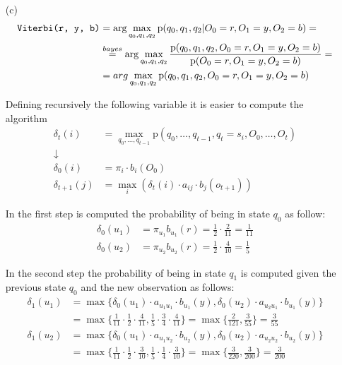 {\begin{itemize}
		\item[(c)]
			\begin{align*}
			\text{\texttt{Viterbi(r, y, b)}} & = \arg \max_{q_0, q_1, q_2} 
			\mathrm{p}(q_0, q_1, q_2 | O_0= r, O_1=y,O_2=b) = \\
			& \overset{bayes}{=} \arg \max_{q_0, q_1, q_2} 
			\frac{\mathrm{p}(q_0, q_1, q_2, O_0= r, O_1=y,O_2=b) 
			}{\mathrm{p}(O_0= r, O_1=y,O_2=b) } = \\
			& = arg \max_{q_0, q_1, q_2} \mathrm{p}(q_0, q_1, q_2, O_0= r, 
			O_1=y,O_2=b)
			\end{align*}
			
			Defining recursively the following variable it is easier to compute 
			the algorithm 
			\begin{align*}
				\delta_{t}(i) & = \max_{q_0, \dots, q_{t-1}} \mathrm{p} (q_0, 
				\dots, q_{t-1}, q_t=s_i, O_0, \dots, O_t)\\
				 \downarrow &\\
				\delta_0(i) & =\pi_i \cdot b_i (O_0) \\ 
				\delta_{t+1}(j) & = \max_i (\delta_t(i)\cdot a_{ij}\cdot 
				b_j(o_{t+1}))
			\end{align*}
			
			In the first step is computed the probability of being in state 
			$q_0$ as follow:
			\begin{align*}
			\delta_0(u_1) & =\pi_{u_1} b_{u_1}(r) = \frac{1}{2} \cdot 
			\frac{2}{11} = \frac{1}{11} \\
			\delta_0(u_2) & = \pi_{u_2} b_{u_2}(r) = \frac{1}{2} \cdot 
			\frac{4}{10} = \frac{1}{5}
			\end{align*}
			
			In the second step the probability of being in state $q_1$ is 
			computed given the previous state $q_0$ and the new observation as 
			follows:
			\begin{align*}
			\delta_1(u_1) & = \max \{ \delta_0(u_1) \cdot a_{u_1 u_1} \cdot 
			b_{u_1}(y), \delta_0(u_2) \cdot a_{u_2 u_1} \cdot b_{u_1}(y) \}
			\\
			& = \max \{ \frac{1}{11} \cdot \frac{1}{2} \cdot 
			\frac{4}{11}, \frac{1}{5} \cdot \frac{3}{4} \cdot \frac{4}{11} \} = 
			\max \{ \frac{2}{121} , \frac{3}{55} \} = \frac{3}{55}
			\\
			\delta_1(u_2) & = \max \{ \delta_0(u_1) \cdot a_{u_1 u_2} \cdot 
			b_{u_2}(y), \delta_0(u_2) \cdot a_{u_2 u_2} \cdot b_{u_2}(y) \}
			\\
			& = \max \{ \frac{1}{11} \cdot \frac{1}{2} \cdot 
			\frac{3}{10}, \frac{1}{5} \cdot \frac{1}{4} \cdot \frac{3}{10} \} = 
			\max \{ \frac{3}{220} , \frac{3}{200} \} = \frac{3}{200} 
			\end{align*}
			

\end{itemize}}
